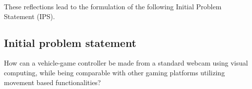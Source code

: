 \noindent These reflections lead to the formulation of the following Initial Problem Statement (IPS).

\subsection{Initial problem statement}
How can a vehicle-game controller be made from a standard webcam using visual computing, while being comparable with other gaming platforms utilizing movement based functionalities?